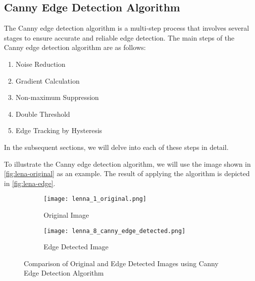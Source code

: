 \subsection{Canny Edge Detection Algorithm}
\label{sec:canny-edge-detection-algorithm}
The Canny edge detection algorithm is a multi-step process that involves several stages to ensure accurate and reliable edge detection. The main steps of the Canny edge detection algorithm are as follows:
\begin{enumerate}
    \item Noise Reduction
    \item Gradient Calculation
    \item Non-maximum Suppression
    \item Double Threshold
    \item Edge Tracking by Hysteresis
\end{enumerate}

In the subsequent sections, we will delve into each of these steps in detail.

To illustrate the Canny edge detection algorithm, we will use the image shown in \autoref{fig:lena-original} as an example. The result of applying the algorithm is depicted in \autoref{fig:lena-edge}.

\begin{figure}[ht]
    \centering
    \begin{subfigure}[b]{0.4\textwidth}
        \centering
        \texttt{[image: lenna\_1\_original.png]}
        \caption{Original Image}
        \label{fig:lena-original}
    \end{subfigure}
    \hfill
    \begin{subfigure}[b]{0.4\textwidth}
        \centering
        \texttt{[image: lenna\_8\_canny\_edge\_detected.png]}
        \caption{Edge Detected Image}
        \label{fig:lena-edge}
    \end{subfigure}
    \caption{Comparison of Original and Edge Detected Images using Canny Edge Detection Algorithm}
    \label{fig:lena-comparison}
\end{figure}

